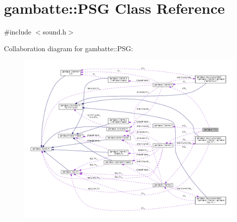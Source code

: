 \hypertarget{classgambatte_1_1PSG}{}\section{gambatte\+:\+:P\+SG Class Reference}
\label{classgambatte_1_1PSG}


{\ttfamily \#include $<$sound.\+h$>$}



Collaboration diagram for gambatte\+:\+:P\+SG\+:
\nopagebreak
\begin{figure}[H]
\begin{center}
\leavevmode
\includegraphics[width=350pt]{classgambatte_1_1PSG__coll__graph}
\end{center}
\end{figure}

